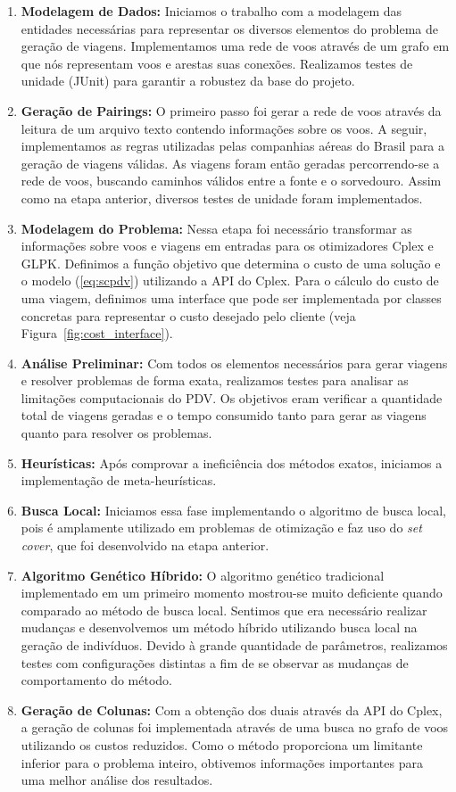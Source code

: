 \begin{enumerate}
\item {\bf Modelagem de Dados:}
Iniciamos o trabalho com a modelagem das entidades necessárias para representar os diversos
elementos do problema de geração de viagens. Implementamos uma rede de voos através de um grafo em
que nós representam voos e arestas suas conexões. Realizamos testes de unidade (JUnit) para
garantir
a robustez da base do projeto.
\item {\bf Geração de Pairings:}
O primeiro passo foi gerar a rede de voos através da leitura de um arquivo texto contendo
informações sobre os voos. A seguir, implementamos as regras utilizadas pelas companhias aéreas do
Brasil para a geração de viagens válidas. As viagens foram então geradas percorrendo-se a rede de
voos, buscando caminhos válidos entre a fonte e o sorvedouro. Assim como na etapa anterior, diversos
testes de unidade foram implementados.
\item {\bf Modelagem do Problema:}
Nessa etapa foi necessário transformar as informações sobre voos e viagens em entradas para os
otimizadores Cplex e GLPK. Definimos a função objetivo que determina o custo de uma solução e o
modelo (\ref{eq:scpdv}) utilizando a API do Cplex. Para o cálculo do custo de uma viagem, definimos 
uma interface que pode ser implementada por classes concretas para representar o custo desejado 
pelo cliente (veja Figura~\ref{fig:cost_interface}).
\item {\bf Análise Preliminar:}
Com todos os elementos necessários para gerar viagens e resolver problemas de forma exata,
realizamos testes para analisar as limitações computacionais do PDV. Os objetivos eram verificar a
quantidade total de viagens geradas e o tempo consumido tanto para gerar as viagens quanto para
resolver os problemas.
\item {\bf Heurísticas:}
Após comprovar a ineficiência dos métodos exatos, iniciamos a implementação de meta-heurísticas.
\item {\bf Busca Local:}
Iniciamos essa fase implementando o algoritmo de busca local, pois é amplamente utilizado em
problemas de otimização e faz uso do {\it set cover}, que foi desenvolvido na etapa anterior.
\item {\bf Algoritmo Genético Híbrido:}
O algoritmo genético tradicional implementado em um primeiro momento mostrou-se muito deficiente
quando comparado ao método de busca local. Sentimos que era necessário realizar mudanças e
desenvolvemos um método híbrido utilizando busca local na geração de indivíduos. Devido à grande
quantidade de parâmetros, realizamos testes com configurações distintas a fim de se observar as
mudanças de comportamento do método.
\item {\bf Geração de Colunas:}
Com a obtenção dos duais através da API do Cplex, a geração de colunas foi implementada através de
uma busca no grafo de voos utilizando os custos reduzidos. Como o método proporciona um limitante
inferior para o problema inteiro, obtivemos informações importantes para uma melhor análise dos
resultados.
\end{enumerate}

